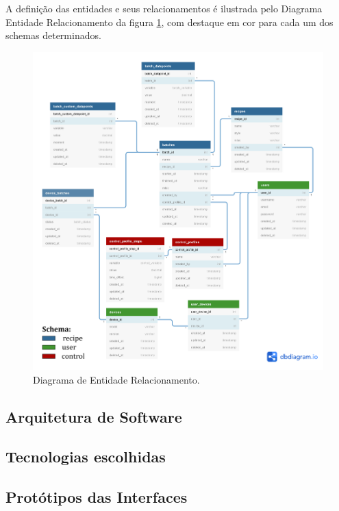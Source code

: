 A definição das entidades e seus relacionamentos é ilustrada pelo Diagrama Entidade Relacionamento da figura \ref{fig:bancodados}, com destaque em cor para cada um 
dos schemas determinados.

\begin{figure}[h]
    \centering
    \includegraphics[scale=0.15]{figuras/projeto/software/banco_de_dados.png}
    \caption{Diagrama de Entidade Relacionamento.}
    \label{fig:bancodados}
\end{figure}

\subsection{Arquitetura de Software}

\subsection{Tecnologias escolhidas}

\subsection{Protótipos das Interfaces}

